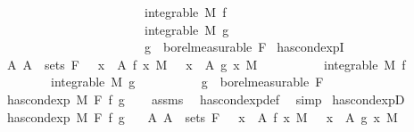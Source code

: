 \begin{isabellebody}
\ \ \ \ \ \ \ \ \ \ \ \ \ \ \ \ \ \ \ \ \ \ \ \ {\isasymand}\ integrable\ M\ f\ \isanewline
\ \ \ \ \ \ \ \ \ \ \ \ \ \ \ \ \ \ \ \ \ \ \ \ {\isasymand}\ integrable\ M\ g\ \isanewline
\ \ \ \ \ \ \ \ \ \ \ \ \ \ \ \ \ \ \ \ \ \ \ \ {\isasymand}\ g\ {\isasymin}\ borel{\isacharunderscore}{\kern0pt}measurable\ F{\isacharparenright}{\kern0pt}{\isachardoublequoteclose}\isanewline
\isanewline
{}\isamarkupfalse%
\ has{\isacharunderscore}{\kern0pt}cond{\isacharunderscore}{\kern0pt}expI{\isacharprime}{\kern0pt}{\isacharcolon}{\kern0pt}\isanewline
\ \ \ {\isachardoublequoteopen}{\isasymAnd}A{\isachardot}{\kern0pt}\ A\ {\isasymin}\ sets\ F\ {\isasymLongrightarrow}\ {\isacharparenleft}{\kern0pt}{\isasymintegral}\ x\ {\isasymin}\ A{\isachardot}{\kern0pt}\ f\ x\ {\isasympartial}M{\isacharparenright}{\kern0pt}\ {\isacharequal}{\kern0pt}\ {\isacharparenleft}{\kern0pt}{\isasymintegral}\ x\ {\isasymin}\ A{\isachardot}{\kern0pt}\ g\ x\ {\isasympartial}M{\isacharparenright}{\kern0pt}{\isachardoublequoteclose}\isanewline
\ \ \ \ \ \ \ \ \ \ {\isachardoublequoteopen}integrable\ M\ f{\isachardoublequoteclose}\isanewline
\ \ \ \ \ \ \ \ \ \ {\isachardoublequoteopen}integrable\ M\ g{\isachardoublequoteclose}\isanewline
\ \ \ \ \ \ \ \ \ \ {\isachardoublequoteopen}g\ {\isasymin}\ borel{\isacharunderscore}{\kern0pt}measurable\ F{\isachardoublequoteclose}\isanewline
\ \ \ {\isachardoublequoteopen}has{\isacharunderscore}{\kern0pt}cond{\isacharunderscore}{\kern0pt}exp\ M\ F\ f\ g{\isachardoublequoteclose}\isanewline
%
\isadelimproof
\ \ %
\endisadelimproof
%
\isatagproof
{}\isamarkupfalse%
\ assms\ \isamarkupfalse%
\ has{\isacharunderscore}{\kern0pt}cond{\isacharunderscore}{\kern0pt}exp{\isacharunderscore}{\kern0pt}def\ \isamarkupfalse%
\ simp%
\endisatagproof
{\isafoldproof}%
%
\isadelimproof
\isanewline
%
\endisadelimproof
\isanewline
{}\isamarkupfalse%
\ has{\isacharunderscore}{\kern0pt}cond{\isacharunderscore}{\kern0pt}expD{\isacharcolon}{\kern0pt}\isanewline
\ \ \ {\isachardoublequoteopen}has{\isacharunderscore}{\kern0pt}cond{\isacharunderscore}{\kern0pt}exp\ M\ F\ f\ g{\isachardoublequoteclose}\isanewline
\ \ \ {\isachardoublequoteopen}{\isasymAnd}A{\isachardot}{\kern0pt}\ A\ {\isasymin}\ sets\ F\ {\isasymLongrightarrow}\ {\isacharparenleft}{\kern0pt}{\isasymintegral}\ x\ {\isasymin}\ A{\isachardot}{\kern0pt}\ f\ x\ {\isasympartial}M{\isacharparenright}{\kern0pt}\ {\isacharequal}{\kern0pt}\ {\isacharparenleft}{\kern0pt}{\isasymintegral}\ x\ {\isasymin}\ A{\isachardot}{\kern0pt}\ g\ x\ {\isasympartial}M{\isacharparenright}{\kern0pt}{\isachardoublequoteclose}\isanewline

\end{isabellebody}

